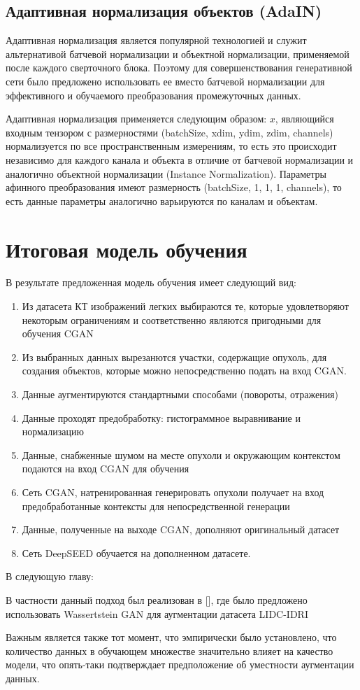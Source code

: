 \subsection{Адаптивная нормализация объектов (AdaIN)}

Адаптивная нормализация является популярной технологией и служит альтернативой батчевой нормализации и объектной нормализации, применяемой после каждого сверточного блока. Поэтому для совершенствования генеративной сети было предложено использовать ее вместо батчевой нормализации для эффективного и обучаемого преобразования промежуточных данных.

Адаптивная нормализация применяется следующим образом: $x$, являющийся входным тензором с размерностями (batchSize, xdim, ydim, zdim, channels) нормализуется по все пространственным измерениям, то есть это происходит независимо для каждого канала и объекта в отличие от батчевой нормализации и аналогично объектной нормализации (Instance Normalization). Параметры афинного преобразования имеют размерность (batchSize, 1, 1, 1, channels), то есть данные параметры аналогично варьируются по каналам и объектам.

\section{Итоговая модель обучения}

В результате предложенная модель обучения имеет следующий вид:

\begin{enumerate}
    \item Из датасета КТ изображений легких выбираются те, которые удовлетворяют некоторым ограничениям и соответственно являются пригодными для обучения CGAN
    \item Из выбранных данных вырезанются участки, содержащие опухоль, для создания объектов, которые можно непосредственно подать на вход CGAN.
    \item Данные аугментируются стандартными способами (повороты, отражения)
    \item Данные проходят предобработку: гистограммное выравнивание и нормализацию
    \item Данные, снабженные шумом на месте опухоли и окружающим контекстом подаются на вход CGAN для обучения
    \item Сеть CGAN, натренированная генерировать опухоли получает на вход предобработанные контексты для непосредственной генерации
    \item Данные, полученные на выходе CGAN, дополняют оригинальный датасет
    \item Сеть DeepSEED обучается на дополненном датасете.
\end{enumerate}

В следующую главу:

 В частности данный подход был реализован в [], где было предложено использовать Wassertstein GAN для аугментации датасета LIDC-IDRI

Важным является также тот момент, что эмпирически было установлено, что количество данных в обучающем множестве значительно влияет на качество модели, что опять-таки подтверждает предположение об уместности аугментации данных.

